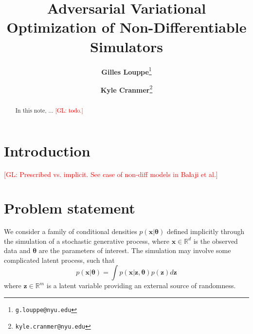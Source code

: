 \documentclass[twocolumn,superscriptaddress,aps]{revtex4-1}
\newcommand{\glnote}[1]{\textcolor{red}{[GL: #1]}}
\theoremstyle{plain}
\begin{document}

\title{\Large{Adversarial Variational Optimization of Non-Differentiable Simulators}}
\vspace{1cm}
\author{\small{\bf Gilles Louppe}\thanks{\texttt{g.louppe@nyu.edu}}}
\author{\small{\bf Kyle Cranmer}\thanks{\texttt{kyle.cranmer@nyu.edu}}}

\begin{abstract}

In this note, ... \glnote{todo.}


\end{abstract}

\maketitle


\section{Introduction}

\glnote{Prescribed vs. implicit. See case of non-diff models in Balaji et al.}



\section{Problem statement}

We consider a family of conditional densities $p(\mathbf{x}|\mathbf{\theta})$
defined implicitly through the simulation of a stochastic generative
process, where $\mathbf{x} \in \mathbb{R}^d$ is the observed data and
$\mathbf{\theta}$ are the parameters of interest. The simulation may involve
some complicated latent process, such that
\begin{equation}\label{eqn:p_x}
    p(\mathbf{x}|\mathbf{\theta}) = \int p(\mathbf{x}|\mathbf{z},\mathbf{\theta}) p(\mathbf{z}) d\mathbf{z}
\end{equation}
where $\mathbf{z} \in \mathbb{R}^m$ is a latent variable providing an external source
of randomness.
\end{document}
